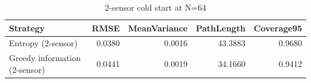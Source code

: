 \begin{table}
\caption{2-sensor cold start at N=64}
\label{tab:two_sensor}
\begin{tabular}{lrrrr}
\toprule
Strategy & RMSE & MeanVariance & PathLength & Coverage95 \\
\midrule
Entropy (2-sensor) & 0.0380 & 0.0016 & 43.3883 & 0.9680 \\
Greedy information (2-sensor) & 0.0441 & 0.0019 & 34.1660 & 0.9412 \\
\bottomrule
\end{tabular}
\end{table}
